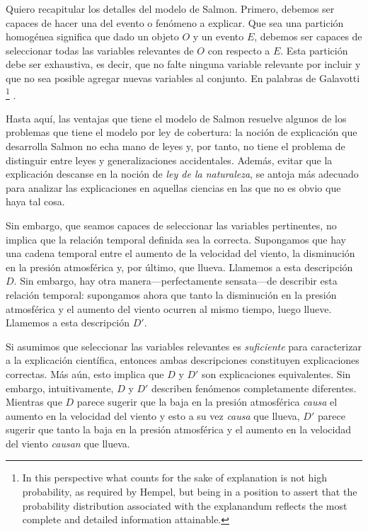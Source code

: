 Quiero recapitular los detalles del modelo de Salmon. Primero,
debemos ser capaces de hacer una  del evento
o fenómeno a explicar. Que sea una partición homogénea significa que
dado un objeto $O$ y un evento $E$, debemos ser capaces de
seleccionar todas las variables relevantes de $O$ con respecto a $E$.
Esta partición debe ser exhaustiva, es decir, que no falte ninguna
variable relevante por incluir y que no sea posible agregar nuevas
variables al conjunto. En palabras de Galavotti  \footnote{ In this perspective what counts
 for the sake of explanation is not high probability, as required by
 Hempel, but being in a position to assert that the probability
 distribution associated with the explanandum reflects the most
 complete and detailed information attainable. }
\parencite{Galavotti2018}.

Hasta aquí, las ventajas que tiene el modelo de Salmon resuelve
algunos de los problemas que tiene el modelo por ley de cobertura: la
noción de explicación que desarrolla Salmon no echa mano de leyes y,
por tanto, no tiene el problema de distinguir entre leyes y
generalizaciones accidentales. Además, evitar que la explicación
descanse en la noción de \emph{ley de la naturaleza}, se antoja más
adecuado para analizar las explicaciones en aquellas ciencias en las
que no es obvio que haya tal cosa.

Sin embargo, que seamos capaces de seleccionar las variables
pertinentes, no implica que la relación temporal definida sea la
correcta. Supongamos que hay una cadena temporal entre el aumento de
la velocidad del viento, la disminución en la presión atmosférica y,
por último, que llueva. Llamemos a esta descripción $D$. Sin embargo,
hay otra manera---perfectamente sensata---de describir esta relación
temporal: supongamos ahora que tanto la disminución en la presión
atmosférica y el aumento del viento ocurren al mismo tiempo, luego
llueve. Llamemos a esta descripción $D'$.

Si asumimos que seleccionar las variables relevantes es
\emph{suficiente} para caracterizar a la explicación científica,
entonces ambas descripciones constituyen explicaciones correctas. Más
aún, esto implica que $D$ y $D'$ son explicaciones equivalentes. Sin
embargo, intuitivamente, $D$ y $D'$ describen fenómenos completamente
diferentes. Mientras que $D$ parece sugerir que la baja en la presión
atmosférica \emph {causa} el aumento en la velocidad del viento y
esto a su vez \emph{causa} que llueva, $D'$ parece sugerir que tanto
la baja en la presión atmosférica y el aumento en la velocidad del
viento \emph{causan} que llueva.

